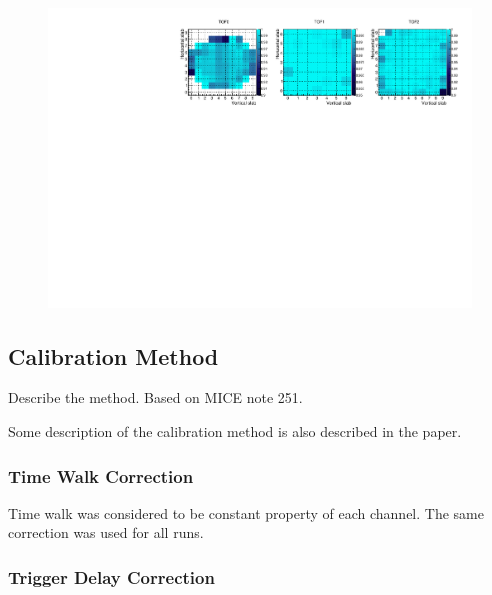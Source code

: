 \begin{figure}
  \begin{center}
  \includegraphics[width=15cm]{08_sp_eff_by_pixel_2d} \\
  \caption{}
  \label{fig:SpEffByPixel}
  \end{center}
\end{figure}




\subsection{Calibration Method}

Describe the method. Based on MICE note 251.


Some description of the calibration method is also described in the paper.



\subsubsection{Time Walk Correction}


Time walk was considered to be constant property of each channel. The
same correction was used for all runs.


\subsubsection{Trigger Delay Correction}


